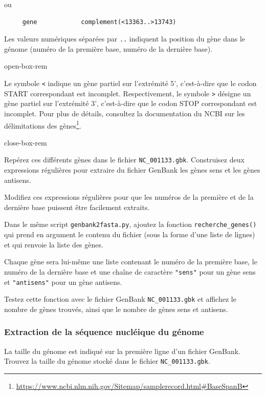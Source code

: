 \documentclass[a4paper,11pt,twoside]{book}
\renewcommand{\href}[2]{#2\footnote{\url{#1}}}
\begin{document}
ou

\begin{verbatim}
     gene            complement(<13363..>13743)
\end{verbatim}

Les valeurs numériques séparées par \texttt{..} indiquent la position du
gène dans le génome (numéro de la première base, numéro de la dernière
base).

open-box-rem

Le symbole \texttt{\textless{}} indique un gène partiel sur l'extrémité
5', c'est-à-dire que le codon START correspondant est incomplet.
Respectivement, le symbole \texttt{\textgreater{}} désigne un gène
partiel sur l'extrémité 3', c'est-à-dire que le codon STOP correspondant
est incomplet. Pour plus de détails, consultez la documentation du NCBI
sur les
\href{https://www.ncbi.nlm.nih.gov/Sitemap/samplerecord.html\#BaseSpanB}{délimitations
des gènes}.

close-box-rem

Repérez ces différents gènes dans le fichier \texttt{NC\_001133.gbk}.
Construisez deux expressions régulières pour extraire du fichier GenBank
les gènes sens et les gènes antisens.

Modifiez ces expressions régulières pour que les numéros de la première
et de la dernière base puissent être facilement extraits.

Dans le même script \texttt{genbank2fasta.py}, ajoutez la fonction
\texttt{recherche\_genes()} qui prend en argument le contenu du fichier
(sous la forme d'une liste de lignes) et qui renvoie la liste des gènes.

Chaque gène sera lui-même une liste contenant le numéro de la première
base, le numéro de la dernière base et une chaîne de caractère
\texttt{"sens"} pour un gène sens et \texttt{"antisens"} pour un gène
antisens.

Testez cette fonction avec le fichier GenBank \texttt{NC\_001133.gbk} et
affichez le nombre de gènes trouvés, ainsi que le nombre de gènes sens
et antisens.

\subsubsection{Extraction de la séquence nucléique du
génome}\label{extraction-de-la-suxe9quence-nucluxe9ique-du-guxe9nome-1}

La taille du génome est indiqué sur la première ligne d'un fichier
GenBank. Trouvez la taille du génome stocké dans le fichier
\texttt{NC\_001133.gbk}.
\end{document}
